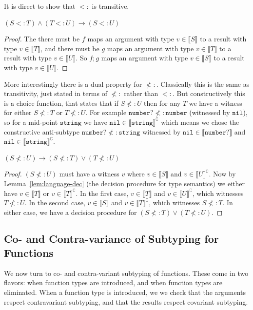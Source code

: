 \documentclass[acmsmall,review,screen]{acmart}
\newcommand{\NIL}{\mathtt{nil}}
\newcommand{\NUMBER}{\mathtt{number}}
\newcommand{\STRING}{\mathtt{string}}
\newcommand{\fun}{\mathbin{\rightarrow}}
\newcommand{\sem}[1]{\llbracket{#1}\rrbracket}
\newcommand{\nsem}[1]{\llbracket{#1}\rrbracket^\complement}
\begin{document}
It is direct to show that $<:$ is transitive.

\begin{lemma}
  $(S <: T) \land (T <: U) \fun (S <: U)$
\end{lemma}
\begin{proof}
  The there must be $f$ maps an argument with type $v \in\sem {S}$ to a result with type $v \in\sem {T}$,
  and there must be $g$ maps an argument with type $v \in\sem {T}$ to a result with type $v \in\sem {U}$.
  So $f;g$ maps an argument with type $v \in\sem {S}$ to a result with type $v \in\sem {U}$.
\end{proof}
More interestingly there is a dual property for $\not<:$.
Classically this is the same as transitivity, just stated in terms of $\not<:$ 
rather than $<:$. But constructively this is a choice function, that states that if
$S \not<: U$ then for any $T$ we have a witness for either $S \not<: T$ or $T \not<: U$.
For example $\NUMBER? \not<: \NUMBER$ (witnessed by $\NIL$), so for a mid-point $\STRING$
we have $\NIL\in\nsem{\STRING}$ which means we chose the constructive anti-subtype
$\NUMBER? \not<: \STRING$ witnessed by $\NIL\in\sem{\NUMBER?}$ and $\NIL\in\nsem{\STRING}$.

\begin{lemma}
  $(S \not<: U) \fun (S \not<: T) \lor (T \not<: U)$
\end{lemma}
\begin{proof}
  $(S \not<: U)$ must have a witness $v$ where
  $v \in \sem{S}$ and $v \in \nsem{U}$.
  Now by Lemma~\ref{lem:language-dec} (the decision procedure for type semantics)
  we either have $v \in \sem{T}$ or $v \in \nsem{T}$. In the first case,
  $v \in \sem{T}$ and $v \in \nsem{U}$, which witnesses $T \not<: U$.
  In the second case,
  $v \in \sem{S}$ and $v \in \nsem{T}$, which witnesses $S \not<: T$.
  In either case, we have a decision procedure for
  $(S \not<: T) \lor (T \not<: U)$.
\end{proof}

\subsection{Co- and Contra-variance of Subtyping for Functions}

We now turn to co- and contra-variant subtyping of functions.
These come in two flavors: when function types are introduced,
and when function types are eliminated.
When a function type is introduced, we
we check that the arguments respect contravariant subtyping,
and that the results respect covariant subtyping.
\end{document}
